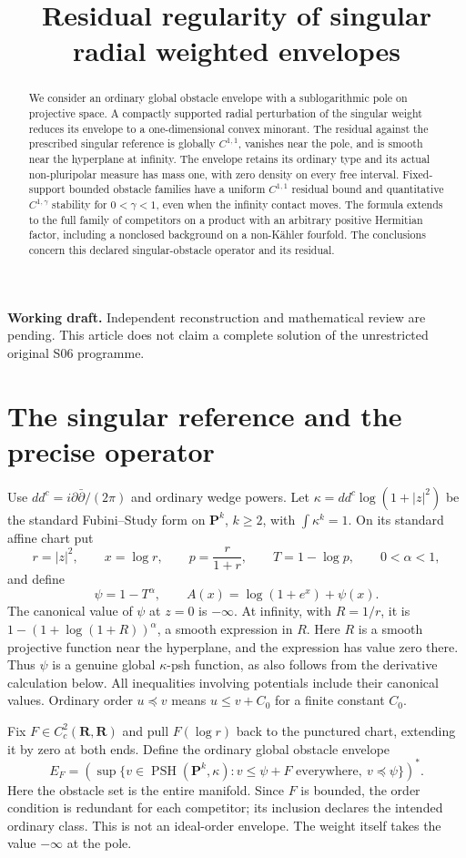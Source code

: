 \documentclass[11pt]{article}
\title{Residual regularity of singular radial weighted envelopes}
\author{}\date{}
\newcommand{\D}{dd^c}
\newcommand{\PSH}{\operatorname{PSH}}
\theoremstyle{remark}\newtheorem{remark}[theorem]{Remark}
\begin{document}
\maketitle
\begin{abstract}
We consider an ordinary global obstacle envelope with a sublogarithmic
pole on projective space. A compactly supported radial perturbation of
the singular weight reduces its envelope to a one-dimensional convex
minorant. The residual against the prescribed singular reference is
globally $C^{1,1}$, vanishes near the pole, and is smooth near the
hyperplane at infinity. The envelope retains its ordinary type and its
actual non-pluripolar measure has mass one, with zero density on every
free interval. Fixed-support bounded obstacle families have a uniform
$C^{1,1}$ residual bound and quantitative $C^{1,\gamma}$ stability for
$0<\gamma<1$, even when the infinity contact moves. The formula extends to the full family of competitors on
a product with an arbitrary positive Hermitian factor, including a
nonclosed background on a non-K\"ahler fourfold. The conclusions concern
this declared singular-obstacle operator and its residual.
\end{abstract}
\noindent\textbf{Working draft.} Independent reconstruction and mathematical
review are pending. This article does not claim a complete solution of
the unrestricted original S06 programme.

\section{The singular reference and the precise operator}
Use $\D=i\partial\bar\partial/(2\pi)$ and ordinary wedge powers.
Let $\kappa=\D\log(1+|z|^2)$ be the standard Fubini--Study form on
$\mathbf P^k$, $k\geq2$, with $\int\kappa^k=1$. On its standard affine
chart put
\[
 r=|z|^2,\qquad x=\log r,\qquad p=\frac r{1+r},\qquad
 T=1-\log p,\qquad 0<\alpha<1,
\]
and define
\[
 \psi=1-T^\alpha,\qquad
 A(x)=\log(1+e^x)+\psi(x).
\]
The canonical value of $\psi$ at $z=0$ is $-\infty$.
At infinity, with $R=1/r$, it is
$1-(1+\log(1+R))^\alpha$, a smooth expression in $R$.
Here $R$ is a smooth projective function near the hyperplane, and the
expression has value zero there. Thus $\psi$ is a genuine global
$\kappa$-psh function, as also follows from the derivative
calculation below. All inequalities involving potentials include their
canonical values. Ordinary order $u\preceq v$ means $u\leq v+C_0$
for a finite constant $C_0$.

Fix $F\in C_c^2(\mathbf R,\mathbf R)$ and pull $F(\log r)$ back to
the punctured chart, extending it by zero at both ends. Define the
ordinary global obstacle envelope
\begin{equation}\label{eq:envelope}
 E_F=\left(\sup\{v\in\PSH(\mathbf P^k,\kappa):
       v\leq\psi+F\text{ everywhere},\ v\preceq\psi\}\right)^*.
\end{equation}
Here the obstacle set is the entire manifold. Since $F$ is bounded,
the order condition is redundant for each competitor; its inclusion
declares the intended ordinary class. This is not an ideal-order
envelope. The weight itself takes the value $-\infty$ at the pole.
\end{document}
